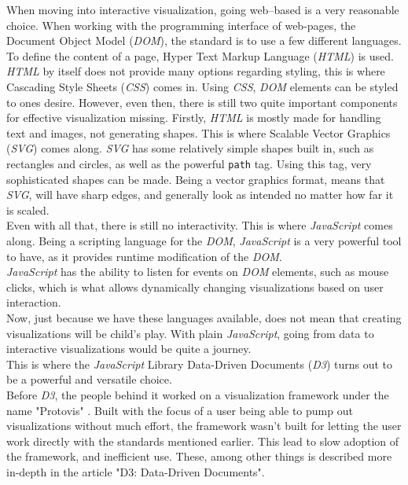 \documentclass[Report.tex]{subfiles}
\begin{document}
	
	When moving into interactive visualization, going web--based is a very reasonable choice. When working with the programming interface of web-pages, the Document Object Model (\emph{DOM}), the standard is to use a few different languages. To define the content of a page, Hyper Text Markup Language (\emph{HTML}) is used. \emph{HTML} by itself does not provide many options regarding styling, this is where Cascading Style Sheets (\emph{CSS}) comes in. Using \emph{CSS}, \emph{DOM} elements can be styled to ones desire. However, even then, there is still two quite important components for effective visualization missing. Firstly, \emph{HTML} is mostly made for handling text and images, not generating shapes. This is where Scalable Vector Graphics (\emph{SVG}) comes along. \emph{SVG} has some relatively simple shapes built in, such as rectangles and circles, as well as the powerful \texttt{path} tag. Using this tag, very sophisticated shapes can be made. Being a vector graphics format, means that \emph{SVG}, will have sharp edges, and generally look as intended no matter how far it is scaled.\\
	Even with all that, there is still no interactivity. This is where \emph{JavaScript} comes along. Being a scripting language for the \emph{DOM}, \emph{JavaScript} is a very powerful tool to have, as it provides runtime modification of the \emph{DOM}. \\\emph{JavaScript} has the ability to listen for events on \emph{DOM} elements, such as mouse clicks, which is what allows dynamically changing visualizations based on user interaction.\\
	Now, just because we have these languages available, does not mean that creating visualizations will be child's play. With plain \emph{JavaScript}, going from data to interactive visualizations would be quite a journey.
	\\
	This is where the \emph{JavaScript} Library Data-Driven Documents (\emph{D3}) turns out to be a powerful and versatile choice.\\ 
	Before \emph{D3}, the people behind it worked on a visualization framework under the name "Protovis" \cite{Protovis}. Built with the focus of a user being able to pump out visualizations without much effort, the framework wasn't built for letting the user work directly with the standards mentioned earlier. This lead to slow adoption of the framework, and inefficient use. These, among other things is described more in-depth in the article "D3: Data-Driven Documents"\cite{D3}.\\
	
\end{document}
